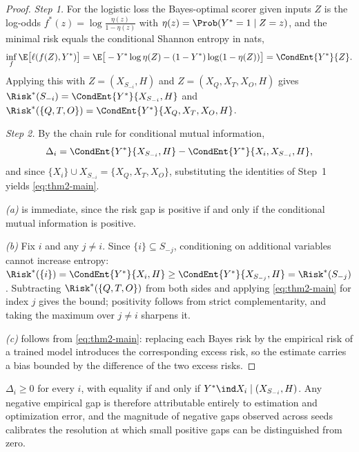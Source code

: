 \begin{proof}
\emph{Step 1.}
For the logistic loss the Bayes-optimal scorer given inputs $Z$ is the log-odds $f^\ast(z) = \log\frac{\eta(z)}{1 - \eta(z)}$ with $\eta(z) = \Prob(Y^\ast = 1 \mid Z = z)$, and the minimal risk equals the conditional Shannon entropy in nats,
\begin{equation}
  \inf_f \E\big[\ell(f(Z), Y^\ast)\big] = \E\big[-Y^\ast \log \eta(Z) - (1 - Y^\ast)\log(1 - \eta(Z))\big] = \CondEnt{Y^\ast}{Z} .
\end{equation}
Applying this with $Z = (X_{S_{-i}}, H)$ and $Z = (X_Q, X_T, X_O, H)$ gives $\Risk^\ast(S_{-i}) = \CondEnt{Y^\ast}{X_{S_{-i}}, H}$ and $\Risk^\ast(\{Q,T,O\}) = \CondEnt{Y^\ast}{X_Q, X_T, X_O, H}$.

\emph{Step 2.}
By the chain rule for conditional mutual information,
\begin{equation}
  \Delta_i = \CondEnt{Y^\ast}{X_{S_{-i}}, H} - \CondEnt{Y^\ast}{X_i, X_{S_{-i}}, H} ,
\end{equation}
and since $\{X_i\} \cup X_{S_{-i}} = \{X_Q, X_T, X_O\}$, substituting the identities of Step~1 yields \eqref{eq:thm2-main}.

\emph{(a)} is immediate, since the risk gap is positive if and only if the conditional mutual information is positive.

\emph{(b)} Fix $i$ and any $j \neq i$. Since $\{i\} \subseteq S_{-j}$, conditioning on additional variables cannot increase entropy: $\Risk^\ast(\{i\}) = \CondEnt{Y^\ast}{X_i, H} \geq \CondEnt{Y^\ast}{X_{S_{-j}}, H} = \Risk^\ast(S_{-j})$. Subtracting $\Risk^\ast(\{Q,T,O\})$ from both sides and applying \eqref{eq:thm2-main} for index $j$ gives the bound; positivity follows from strict complementarity, and taking the maximum over $j \neq i$ sharpens it.

\emph{(c)} follows from \eqref{eq:thm2-main}: replacing each Bayes risk by the empirical risk of a trained model introduces the corresponding excess risk, so the estimate carries a bias bounded by the difference of the two excess risks.
\end{proof}

\begin{corollary}
\label{cor:nonneg}
$\Delta_i \geq 0$ for every $i$, with equality if and only if $Y^\ast \ind X_i \mid (X_{S_{-i}}, H)$. Any negative empirical gap is therefore attributable entirely to estimation and optimization error, and the magnitude of negative gaps observed across seeds calibrates the resolution at which small positive gaps can be distinguished from zero.
\end{corollary}

